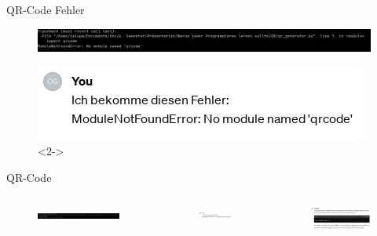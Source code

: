 \documentclass[a4paper,
	DIV=13,
	14pt,
	BCOR=10mm,
	department=FakEI,
	twoside,
	parskip=half,
	automark,
	aspectratio=169
]{beamer}
\begin{document}
\begin{frame}{QR-Code Fehler}
	\begin{figure}[H]
		\includegraphics[width=\linewidth]{img/Error.png}
	\end{figure}
	\begin{figure}[H]
		\includegraphics[width=\linewidth]{img/ChatGPT-error-Q.png}<2->
	\end{figure}
\end{frame}

\begin{frame}{QR-Code}
	\begin{columns}
		\begin{figure}[H]
			\includegraphics[width=\linewidth]{img/Error.png}
		\end{figure}

		\begin{figure}[H]
			\includegraphics[width=\linewidth]{img/ChatGPT-error-Q.png}
		\end{figure}

		\begin{figure}[H]
			\includegraphics[width=\linewidth]{img/ChatGPT-error-A.png}
		\end{figure}
	\end{columns}
\end{frame}
\end{document}
